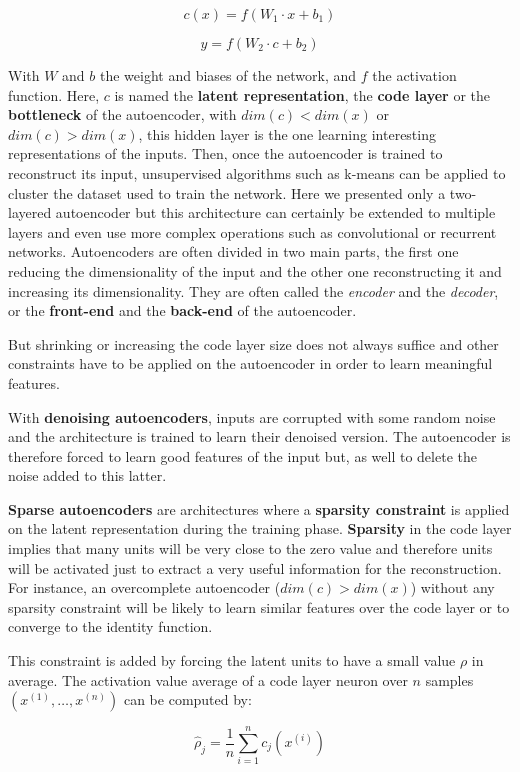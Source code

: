 \documentclass[master, tikz, final,11pt, dvipdfmx]{iscs-thesis}
\begin{document}
\[
c(x) = f(W_1 \cdot x + b_1)
\]

\[
y = f(W_2 \cdot c + b_2)
\]

With $W$ and $b$ the weight and biases of the network, and $f$ the activation function. Here, $c$ is named the \textbf{latent representation},  the \textbf{code layer} or the \textbf{bottleneck} of the autoencoder, with $dim(c) < dim(x)$ or $dim(c) > dim(x)$, this hidden layer is the one learning interesting representations of the inputs. Then, once the autoencoder is trained to reconstruct its input, unsupervised algorithms such as k-means can be applied to cluster the dataset used to train the network.
Here we presented only a two-layered autoencoder but this architecture can certainly be extended to multiple layers and even use more complex operations such as convolutional or recurrent networks. Autoencoders are often divided in two main parts, the first one reducing the dimensionality of the input and the other one reconstructing it and increasing its dimensionality. They are often called the \textit{encoder} and the \textit{decoder}, or the \textbf{front-end} and the \textbf{back-end} of the autoencoder.

But shrinking or increasing the code layer size does not always suffice and other constraints have to be applied on the autoencoder in order to learn meaningful features.

With \textbf{denoising autoencoders}, inputs are corrupted with some random noise and the architecture is trained to learn their denoised version. The autoencoder is therefore forced to learn good features of the input but, as well to delete the noise added to this latter.

\textbf{Sparse autoencoders} are architectures where a \textbf{sparsity constraint} is applied on the latent representation during the training phase. \textbf{Sparsity} in the code layer implies that many units will be very close to the zero value and therefore units will be activated just to extract a very useful information for the reconstruction. For instance, an overcomplete autoencoder ($dim(c) > dim(x)$) without any sparsity constraint will be likely to learn similar features over the code layer or to converge to the identity function.

This constraint is added by forcing the latent units to have a small value $\rho$ in average. The activation value average of a code layer neuron over $n$ samples $(x^{(1)}, \dots, x^{(n)})$ can be computed by:

\[
\hat{\rho}_j = \frac{1}{n}\sum_{i=1}^n{c_j(x^{(i)})}
\]
\end{document}
